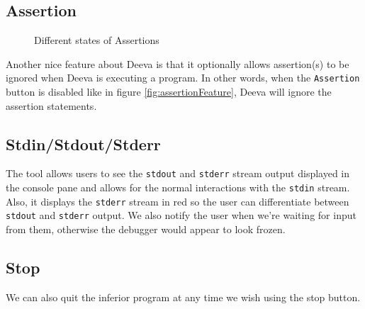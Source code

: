 \documentclass[11pt, a4paper]{article}
\newcommand{\cmd}[1]{{\tt #1}}
\begin{document}
\subsection{Assertion}
\begin{figure}[h!]
\centering
{}
\quad
{}
\caption{Different states of Assertions}
\end{figure}
Another nice feature about Deeva is that it optionally allows assertion(s) to be ignored when Deeva is executing a program.
In other words, when the {\tt Assertion} button is disabled like in figure \ref{fig:assertionFeature}, Deeva will ignore the assertion statements.

\subsection{Stdin/Stdout/Stderr}
The tool allows users to see the \cmd{stdout} and \cmd{stderr} stream output displayed in the console pane and allows for the normal interactions with the \cmd{stdin} stream. Also, it displays the \cmd{stderr} stream in red so the user can differentiate between \cmd{stdout} and \cmd{stderr} output.
We also notify the user when we're waiting for input from them, otherwise the debugger would appear to look frozen.

\subsection{Stop}
We can also quit the inferior program at any time we wish using the stop button.
\end{document}
